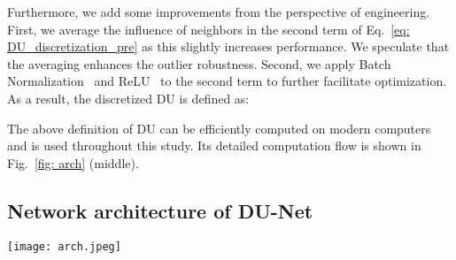 \documentclass[a4paper,fleqn]{cas-dc}
\begin{document}
Furthermore, we add some improvements from the perspective of engineering. First, we average the influence of neighbors in the second term of Eq.~\eqref{eq: DU_discretization_pre} as this slightly increases performance. We speculate that the averaging enhances the outlier robustness. 
Second, we apply Batch Normalization~\cite{ioffe2015batch} and ReLU~\cite{glorot2011deep}  to the second term to further facilitate optimization. 
As a result, the discretized DU is defined as:

The above definition of DU can be efficiently computed on modern computers and is used throughout this study. Its detailed computation flow is shown in Fig.~\ref{fig: arch} (middle). 






















































\subsection{Network architecture of DU-Net}\label{sec: arch}
\begin{figure*}[t]
    \centering
    \texttt{[image: arch.jpeg]}
    \caption{The network architecture used in this study and the computation flow of the discretized DU (Eq.~\eqref{eq: discretized_DU}). Top: the network architecture. Middle: computation flow of the DU. Here we assume the input is a point with a -dimensional feature.  and  denote neighborhood aggregation using summation and element-wise sum, respectively. }
    \label{fig: arch}
\end{figure*}
\end{document}
